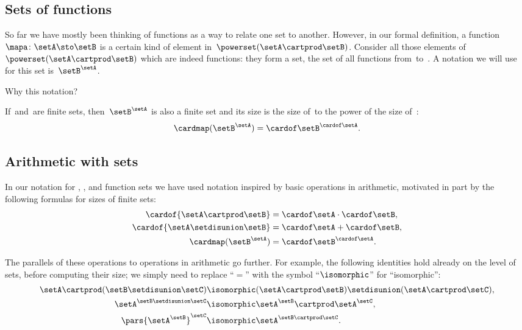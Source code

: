 
\subsection{Sets of functions}

So far we have mostly been thinking of functions as a way to relate one set to another.
However, in our formal definition, a function~$\mapa \colon \setA \sto \setB$ is a certain kind of element in~$\powerset (\setA \cartprod \setB)$.
Consider all those elements of~$\powerset (\setA \cartprod \setB)$ which are indeed functions: they form a set, the set of all functions from~\setA to~\setB.
A notation we will use for this set is~$\setB^{\setA}$.

Why this notation?

If~\setA and~\setB are finite sets, then~$\setB^{\setA}$ is also a finite set and its size is the size of~\setB to the power of the size of~\setA:
\begin{equation}
    \cardmap(\setB^{\setA}) = {\cardof\setB} ^ {\cardof \setA}.
\end{equation}

\subsection{Arithmetic with sets}

In our notation for , , and function sets we have used notation inspired by basic operations in arithmetic, motivated in part by the following formulas for sizes of finite sets:
\begin{align}
    \cardof{\setA \cartprod \setB}     & = \cardof \setA \cdot \cardof \setB, \\
    \cardof{ \setA \setdisunion \setB} & = \cardof \setA + \cardof \setB, \\
    \cardmap(\setB^{\setA})            & = {\cardof\setB}^{\cardof\setA}.
\end{align}

The parallels of these operations to operations in arithmetic go further.
For example, the following identities hold already on the level of sets, before computing their size; we simply need to replace ``$=$'' with the symbol ``$\isomorphic$'' for ``isomorphic'':
\begin{align}
    \setA \cartprod (\setB \setdisunion \setC) & \isomorphic (\setA \cartprod \setB) \setdisunion (\setA \cartprod \setC), \\
    \setA^{\setB \setdisunion \setC}           & \isomorphic \setA^\setB \cartprod \setA^\setC, \\
    \pars{\setA^\setB}^\setC                   & \isomorphic \setA^{\setB \cartprod \setC}.
\end{align}

